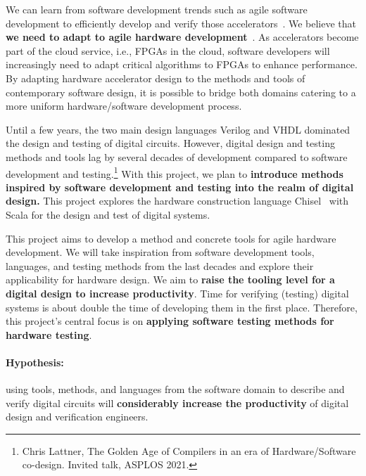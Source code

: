 \documentclass[fleqn,12pt]{article}
\begin{document}
We can learn from software development trends such as agile software development
to efficiently develop and verify those accelerators~\cite{agile:manifesto}.
We believe that {\bf we need to adapt to agile hardware development}~\cite{henn-patt:turing:2019}.
%
As accelerators become part of the cloud service, i.e., FPGAs in the cloud,
software developers will increasingly need to adapt critical algorithms to FPGAs to enhance performance.
By adapting hardware accelerator design to the methods and tools of contemporary software design,
it is possible to bridge both domains catering to a more uniform hardware/software development process.

Until a few years, the two main design languages Verilog and VHDL dominated the
design and testing of digital circuits.
However, digital design and testing methods and tools lag by several decades of development
compared to software development and testing.\footnote{Chris Lattner, The Golden Age of Compilers in an era of Hardware/Software co-design. Invited talk, ASPLOS 2021.}
With this project, we plan to
{\bf introduce methods inspired by software development and testing into the realm of digital design.}
This project explores the hardware construction language Chisel~\cite{chisel:dac2012} with Scala
for the design and test of digital systems.

This project aims to develop a method and concrete tools for agile hardware development.
{We will take inspiration from software development tools, languages, and testing methods
from the last decades and explore their applicability for hardware design.}
We aim to {\bf raise the tooling level for a digital design to increase productivity}.
Time for verifying (testing) digital systems is about double the time of developing
them in the first place.
Therefore, this project's central focus is on {\bf applying software
testing methods for hardware testing}.


\paragraph{Hypothesis:} using tools, methods, and languages from the
software domain to describe and verify digital circuits will {\bf considerably increase the productivity}
of digital design and verification engineers.
\end{document}
